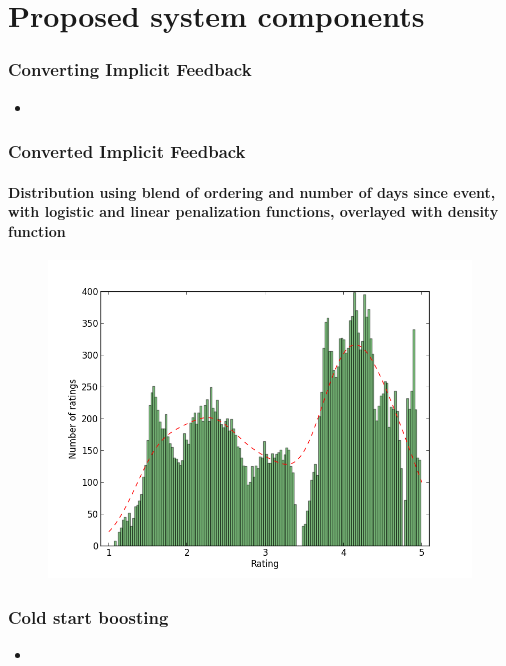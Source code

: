 \documentclass{beamer}
\begin{document}
  \section{Proposed system components}

  \begin{frame}
    \frametitle{Converting Implicit Feedback}
    \begin{itemize}
      \item
    \end{itemize}
  \end{frame}

  \begin{frame}
    \frametitle{Converted Implicit Feedback}
    \framesubtitle{Distribution using blend of ordering and number of days since event, with logistic and linear penalization functions, overlayed with density function}
    \begin{figure}[H]
        \includegraphics[scale=0.4]{../src/image/dist-blend}
        \centering
    \end{figure}
  \end{frame}

  \begin{frame}
    \frametitle{Cold start boosting}
    \begin{itemize}
      \item
    \end{itemize}
  \end{frame}
\end{document}
